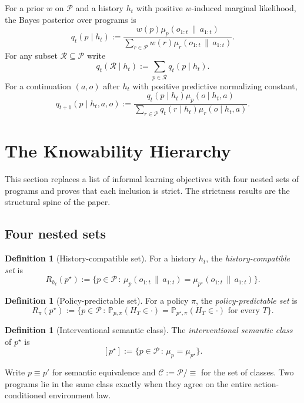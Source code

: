 \documentclass[11pt]{article}
\theoremstyle{definition}
\newtheorem{definition}[theorem]{Definition}
\theoremstyle{remark}
\newcommand{\Ccal}{\mathcal{C}}
\newcommand{\Pcal}{\mathcal{P}}
\newcommand{\Rcal}{\mathcal{R}}
\newcommand{\Prob}{\mathbb{P}}
\newcommand{\givena}{\,\|\,}
\begin{document}
For a prior $w$ on $\Pcal$ and a history $h_t$ with positive $w$-induced marginal likelihood, the Bayes posterior over programs is
\[
q_t(p\mid h_t)
:=
\frac{w(p)\mu_p(o_{1:t}\givena a_{1:t})}
{\sum_{r\in\Pcal} w(r)\mu_r(o_{1:t}\givena a_{1:t})}.
\]
For any subset $\Rcal\subseteq\Pcal$ write
\[
q_t(\Rcal\mid h_t):=\sum_{p\in\Rcal} q_t(p\mid h_t).
\]
For a continuation $(a,o)$ after $h_t$ with positive predictive normalizing constant,
\[
q_{t+1}(p\mid h_t,a,o)
:=
\frac{q_t(p\mid h_t)\mu_p(o\mid h_t,a)}
{\sum_{r\in\Pcal} q_t(r\mid h_t)\mu_r(o\mid h_t,a)}.
\]

\section{The Knowability Hierarchy}
\label{sec:hierarchy}

This section replaces a list of informal learning objectives with four nested sets of programs and proves that each inclusion is strict. The strictness results are the structural spine of the paper.

\subsection{Four nested sets}

\begin{definition}[History-compatible set]
\label{def:history-compat}
For a history $h_t$, the \emph{history-compatible set} is
\[
R_{h_t}(p^\star)
:=
\bigl\{p\in\Pcal\,:\,\mu_p(o_{1:t}\givena a_{1:t})=\mu_{p^\star}(o_{1:t}\givena a_{1:t})\bigr\}.
\]
\end{definition}

\begin{definition}[Policy-predictable set]
\label{def:policy-pred}
For a policy $\pi$, the \emph{policy-predictable set} is
\[
R_\pi(p^\star)
:=
\bigl\{p\in\Pcal\,:\,\Prob_{p,\pi}(H_T\in\cdot)=\Prob_{p^\star,\pi}(H_T\in\cdot)\text{ for every }T\bigr\}.
\]
\end{definition}

\begin{definition}[Interventional semantic class]
\label{def:int-sem-class}
The \emph{interventional semantic class} of $p^\star$ is
\[
[p^\star]
:=
\bigl\{p\in\Pcal\,:\,\mu_p=\mu_{p^\star}\bigr\}.
\]
\end{definition}

Write $p\equiv p'$ for semantic equivalence and $\Ccal:=\Pcal/\!\equiv$ for the set of classes. Two programs lie in the same class exactly when they agree on the entire action-conditioned environment law.
\end{document}
